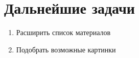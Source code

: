 \section{Дальнейшие задачи}
\begin{enumerate}
\item Расширить список материалов
\item Подобрать возможные картинки
\end{enumerate}